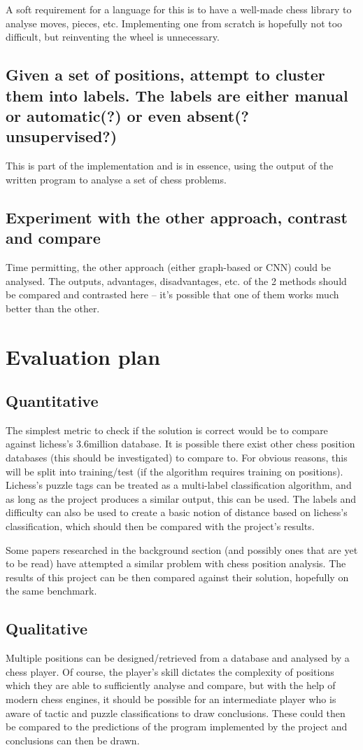 A soft requirement for a language for this is to have a well-made chess library
to analyse moves, pieces, etc. Implementing one from scratch is hopefully not
too difficult, but reinventing the wheel is unnecessary.

\subsection{Given a set of positions, attempt to cluster them into labels. The labels
are either manual or automatic(?) or even absent(? unsupervised?)}
This is part of the implementation and is in essence, using the output of the 
written program to analyse a set of chess problems.

\subsection{Experiment with the other approach, contrast and compare}
Time permitting, the other approach (either graph-based or CNN) could be analysed.
The outputs, advantages, disadvantages, etc. of the 2 methods should be compared
and contrasted here -- it's possible that one of them works much better than the other.


\section{Evaluation plan}
\subsection{Quantitative}
The simplest metric to check if the solution is correct would be to compare
against lichess's 3.6million database. It is possible there exist other
chess position databases (this should be investigated) to compare to. For
obvious reasons, this will be split into training/test (if the algorithm requires
training on positions). Lichess's puzzle tags can be treated as a multi-label
classification algorithm, and as long as the project produces a similar output,
this can be used. The labels and difficulty can also be used to create a basic
notion of distance based on lichess's classification, which should then be compared
with the project's results.

Some papers researched in the background section (and possibly ones that are yet
to be read) have attempted a similar problem with chess position analysis. The
results of this project can be then compared against their solution, hopefully
on the same benchmark.

\subsection{Qualitative}
Multiple positions can be designed/retrieved from a database and analysed by a
chess player. Of course, the player's skill dictates the complexity of positions
which they are able to sufficiently analyse and compare, but with the help of
modern chess engines, it should be possible for an intermediate player who is
aware of tactic and puzzle classifications to draw conclusions. These could then
be compared to the predictions of the program implemented by the project and 
conclusions can then be drawn. 